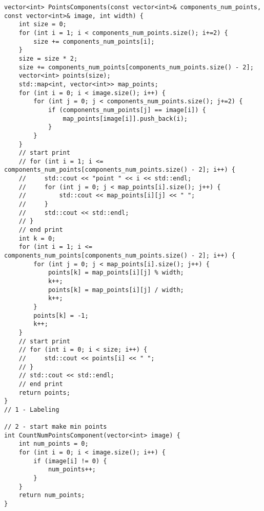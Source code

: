 \documentclass{report}
\begin{document}
\begin{lstlisting}
vector<int> PointsComponents(const vector<int>& components_num_points, const vector<int>& image, int width) {
    int size = 0;
    for (int i = 1; i < components_num_points.size(); i+=2) {
        size += components_num_points[i];
    }
    size = size * 2;
    size += components_num_points[components_num_points.size() - 2];
    vector<int> points(size);
    std::map<int, vector<int>> map_points;
    for (int i = 0; i < image.size(); i++) {
        for (int j = 0; j < components_num_points.size(); j+=2) {
            if (components_num_points[j] == image[i]) {
                map_points[image[i]].push_back(i);
            }
        }
    }
    // start print
    // for (int i = 1; i <= components_num_points[components_num_points.size() - 2]; i++) {
    //     std::cout << "point " << i << std::endl;
    //     for (int j = 0; j < map_points[i].size(); j++) {
    //         std::cout << map_points[i][j] << " ";
    //     }
    //     std::cout << std::endl;
    // }
    // end print
    int k = 0;
    for (int i = 1; i <= components_num_points[components_num_points.size() - 2]; i++) {
        for (int j = 0; j < map_points[i].size(); j++) {
            points[k] = map_points[i][j] % width;
            k++;
            points[k] = map_points[i][j] / width;
            k++;
        }
        points[k] = -1;
        k++;
    }
    // start print
    // for (int i = 0; i < size; i++) {
    //     std::cout << points[i] << " ";
    // }
    // std::cout << std::endl;
    // end print
    return points;
}
// 1 - Labeling

// 2 - start make min points
int CountNumPointsComponent(vector<int> image) {
    int num_points = 0;
    for (int i = 0; i < image.size(); i++) {
        if (image[i] != 0) {
            num_points++;
        }
    }
    return num_points;
}


\end{lstlisting}
\end{document}
